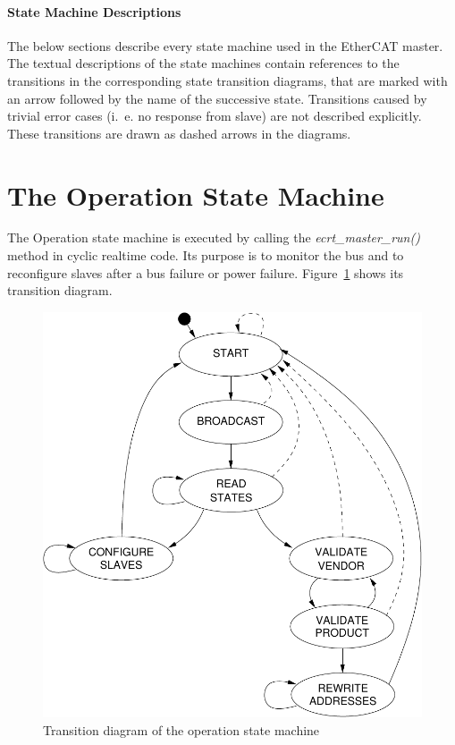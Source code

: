 \documentclass[a4paper,12pt,BCOR6mm,bibtotoc,idxtotoc]{scrbook}
\begin{document}
\paragraph{State Machine Descriptions}

The below sections describe every state machine used in the EtherCAT
master. The textual descriptions of the state machines contain
references to the transitions in the corresponding state transition
diagrams, that are marked with an arrow followed by the name of the
successive state.  Transitions caused by trivial error cases (i.~e. no
response from slave) are not described explicitly. These transitions
are drawn as dashed arrows in the diagrams.


\section{The Operation State Machine}
\label{sec:fsm-op}

The Operation state machine is executed by calling the
\textit{ecrt\_master\_run()} method in cyclic realtime code. Its
purpose is to monitor the bus and to reconfigure slaves after a bus
failure or power failure. Figure~\ref{fig:fsm-op} shows its transition
diagram.

\begin{figure}[htbp]
  \centering
  \includegraphics[width=.8\textwidth]{images/fsm-op}
  \caption{Transition diagram of the operation state machine}
  \label{fig:fsm-op}
\end{figure}
\end{document}
